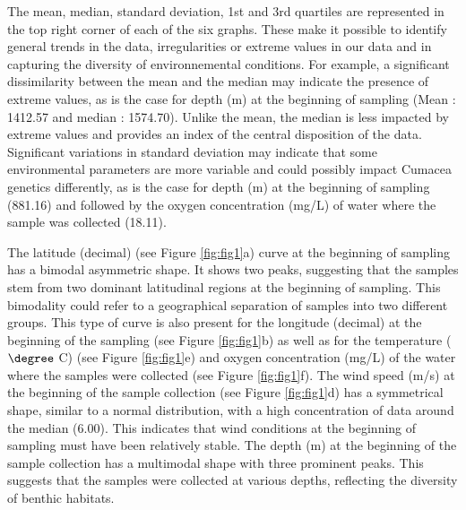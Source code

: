 The mean, median, standard deviation, 1st and 3rd quartiles are represented in the top right corner of each of the six graphs. These make it possible to identify general trends in the data, irregularities or extreme values in our data and in capturing the diversity of environnemental conditions. For example, a significant dissimilarity between the mean and the median may indicate the presence of extreme values, as is the case for depth (m) at the beginning of sampling (Mean : 1412.57 and median : 1574.70). Unlike the mean, the median is less impacted by extreme values and provides an index of the central disposition of the data. Significant variations in standard deviation may indicate that some environmental parameters are more variable and could possibly impact Cumacea genetics differently, as is the case for depth (m) at the beginning of sampling (881.16) and followed by the oxygen concentration (mg/L) of water where the sample was collected (18.11). 

The latitude (decimal) (see Figure \ref{fig:fig1}a) curve at the beginning of sampling has a bimodal asymmetric shape. It shows two peaks, suggesting that the samples stem from two dominant latitudinal regions at the beginning of sampling. This bimodality could refer to a geographical separation of samples into two different groups. This type of curve is also present for the longitude (decimal) at the beginning of the sampling (see Figure \ref{fig:fig1}b) as well as for the temperature ($\degree$ C) (see Figure \ref{fig:fig1}e) and oxygen concentration (mg/L) of the water where the samples were collected (see Figure \ref{fig:fig1}f). The wind speed (m/s) at the beginning of the sample collection (see Figure \ref{fig:fig1}d) has a symmetrical shape, similar to a normal distribution, with a high concentration of data around the median (6.00). This indicates that wind conditions at the beginning of sampling must have been relatively stable. The depth (m) at the beginning of the sample collection has a multimodal shape with three prominent peaks. This suggests that the samples were collected at various depths, reflecting the diversity of benthic habitats.

